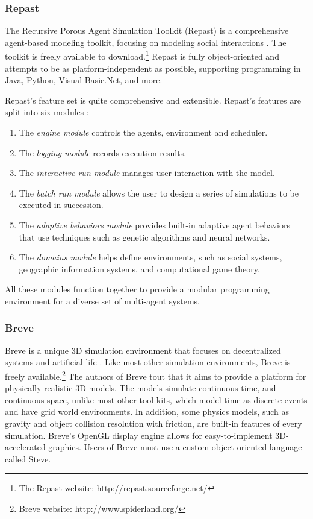 \subsubsection{Repast}
The Recursive Porous Agent Simulation Toolkit (Repast) is a comprehensive agent-based modeling toolkit, focusing on modeling social interactions \cite{collier2003ref}.
The toolkit is freely available to download.\footnote{The Repast website: http://repast.sourceforge.net/}
Repast is fully object-oriented and attempts to be as platform-independent as possible, supporting programming in Java, Python, Visual Basic.Net, and more.

Repast's feature set is quite comprehensive and extensible. Repast's features are split into six modules \cite{north2006experiences}:
\begin{enumerate}
   \item The \textit{engine module} controls the agents, environment and scheduler.
   \item The \textit{logging module} records execution results.
   \item The \textit{interactive run module} manages user interaction with the model.
   \item The \textit{batch run module} allows the user to design a series of simulations to be executed in succession.
   \item The \textit{adaptive behaviors module} provides built-in adaptive agent behaviors that use techniques such as genetic algorithms and neural networks.
   \item The \textit{domains module} helps define environments, such as social systems, geographic information systems, and computational game theory.
\end{enumerate}
All these modules function together to provide a modular programming environment for a diverse set of multi-agent systems.
   
\subsubsection{Breve}
Breve is a unique 3D simulation environment that focuses on decentralized systems and artificial life \cite{kleinbreve}.
Like most other simulation environments, Breve is freely available.\footnote{Breve website:  http://www.spiderland.org/}
The authors of Breve tout that it aims to provide a platform for physically realistic 3D models.
The models simulate continuous time, and continuous space, unlike most other tool kits, which model time as discrete events and have grid world environments.
In addition, some physics models, such as gravity and object collision resolution with friction, are built-in features of every simulation.
Breve's OpenGL display engine allows for easy-to-implement 3D-accelerated graphics.
Users of Breve must use a custom object-oriented language called Steve.


